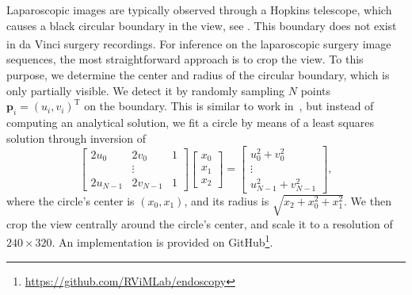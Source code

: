 Laparoscopic images are typically observed through a Hopkins telescope, which causes a black circular boundary in the view, see . This boundary does not exist in da Vinci\textsuperscript{\textregistered} surgery recordings. For inference on the laparoscopic surgery image sequences, the most straightforward approach is to crop the view. To this purpose, we determine the center and radius of the circular boundary, which is only partially visible. We detect it by randomly sampling $N$ points $\mathbf{p}_i = (u_i,v_i)^\text{T}$ on the boundary. This is similar to work in~\cite{munzer2013detection,Budd2022RapidDataset}, but instead of computing an analytical solution, we fit a circle by means of a least squares solution through inversion of
\begin{equation}
    \begin{bmatrix}
        2u_0     & 2v_0     & 1 \\
                 & \vdots   & \\
        2u_{N-1} & 2v_{N-1} & 1
    \end{bmatrix}
    \begin{bmatrix}
        x_0 \\ x_1 \\ x_2
    \end{bmatrix} = 
    \begin{bmatrix}
        u_0^2 + v_0^2 \\
        \vdots        \\
        u_{N-1}^2 + v_{N-1}^2
    \end{bmatrix},
\end{equation}
where the circle's center is $(x_0, x_1)$, and its radius is $\sqrt{x_2 + x^2_0 + x^2_1}$. We then crop the view centrally around the circle's center, and scale it to a resolution of $240\times320$. An implementation is provided on GitHub\footnote[2]{\url{https://github.com/RViMLab/endoscopy}}.
